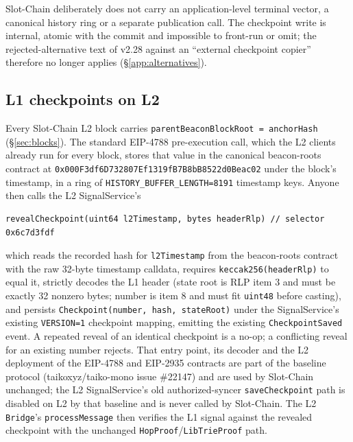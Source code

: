 \documentclass[a4paper,11pt]{article}
\newcommand{\code}[1]{\nolinkurl{#1}}
\begin{document}
Slot-Chain deliberately does not carry an application-level terminal vector,
a canonical history ring or a separate publication call.  The checkpoint
write is internal, atomic with the commit and impossible to front-run or omit;
the rejected-alternative text of v2.28 against an ``external checkpoint
copier'' therefore no longer applies (\S\ref{app:alternatives}).

\subsection{L1 checkpoints on L2}

Every Slot-Chain L2 block carries \code{parentBeaconBlockRoot = anchorHash}
(\S\ref{sec:blocks}).  The standard EIP-4788 pre-execution call, which the L2
clients already run for every block, stores that value in the canonical
beacon-roots contract at
\code{0x000F3df6D732807Ef1319fB7B8bB8522d0Beac02} under the block's timestamp,
in a ring of \code{HISTORY_BUFFER_LENGTH=8191} timestamp keys.  Anyone then
calls the L2 SignalService's
\begin{verbatim}
revealCheckpoint(uint64 l2Timestamp, bytes headerRlp) // selector 0x6c7d3fdf
\end{verbatim}
which reads the recorded hash for \code{l2Timestamp} from the beacon-roots
contract with the raw 32-byte timestamp calldata, requires
\code{keccak256(headerRlp)} to equal it, strictly decodes the L1 header (state
root is RLP item 3 and must be exactly 32 nonzero bytes; number is item 8 and
must fit \code{uint48} before casting), and persists
\code{Checkpoint(number, hash, stateRoot)} under the SignalService's existing
\code{VERSION=1} checkpoint mapping, emitting the existing
\code{CheckpointSaved} event.  A repeated reveal of an identical checkpoint is
a no-op; a conflicting reveal for an existing number rejects.  That entry
point, its decoder and the L2 deployment of the EIP-4788 and EIP-2935
contracts are part of the baseline protocol (taikoxyz/taiko-mono issue
\#22147) and are used by Slot-Chain unchanged; the L2 SignalService's old
authorized-syncer \code{saveCheckpoint} path is disabled on L2 by that
baseline and is never called by Slot-Chain.  The L2 \code{Bridge}'s
\code{processMessage} then verifies the L1 signal against the revealed
checkpoint with the unchanged \code{HopProof}/\code{LibTrieProof} path.
\end{document}

